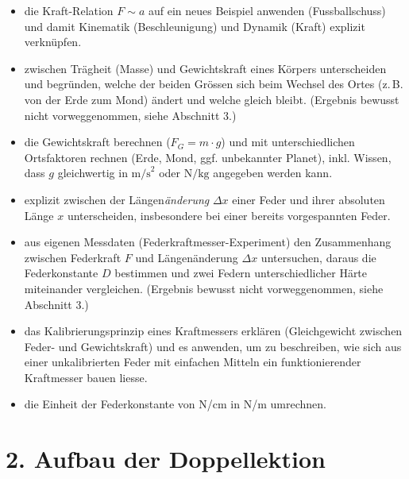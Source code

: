\documentclass[11pt,a4paper]{article}
\begin{document}
\begin{itemize}[leftmargin=1.3cm,itemsep=0.3em]
  \item[LZ1] die Kraft-Relation $F\sim a$ auf ein neues Beispiel anwenden
  (Fussballschuss) und damit Kinematik (Beschleunigung) und Dynamik (Kraft)
  explizit verknüpfen.
  \item[LZ2] zwischen Trägheit (Masse) und Gewichtskraft eines Körpers
  unterscheiden und begründen, welche der beiden Grössen sich beim Wechsel
  des Ortes (z.\,B. von der Erde zum Mond) ändert und welche gleich bleibt.
  (Ergebnis bewusst nicht vorweggenommen, siehe Abschnitt 3.)
  \item[LZ3] die Gewichtskraft berechnen ($F_G=m\cdot g$) und mit
  unterschiedlichen Ortsfaktoren rechnen (Erde, Mond, ggf. unbekannter
  Planet), inkl. Wissen, dass $g$ gleichwertig in $\text{m/s}^2$ oder
  $\text{N/kg}$ angegeben werden kann.
  \item[LZ4] explizit zwischen der Längen\emph{änderung} $\Delta x$ einer
  Feder und ihrer absoluten Länge $x$ unterscheiden, insbesondere bei einer
  bereits vorgespannten Feder.
  \item[LZ5] aus eigenen Messdaten (Federkraftmesser-Experiment) den
  Zusammenhang zwischen Federkraft $F$ und Längenänderung $\Delta x$
  untersuchen, daraus die Federkonstante $D$ bestimmen und zwei Federn
  unterschiedlicher Härte miteinander vergleichen. (Ergebnis bewusst nicht
  vorweggenommen, siehe Abschnitt 3.)
  \item[LZ6] das Kalibrierungsprinzip eines Kraftmessers erklären
  (Gleichgewicht zwischen Feder- und Gewichtskraft) und es anwenden, um zu
  beschreiben, wie sich aus einer unkalibrierten Feder mit einfachen
  Mitteln ein funktionierender Kraftmesser bauen liesse.
  \item[LZ7] die Einheit der Federkonstante von N/cm in N/m umrechnen.
\end{itemize}

\section*{2. Aufbau der Doppellektion}
\end{document}
